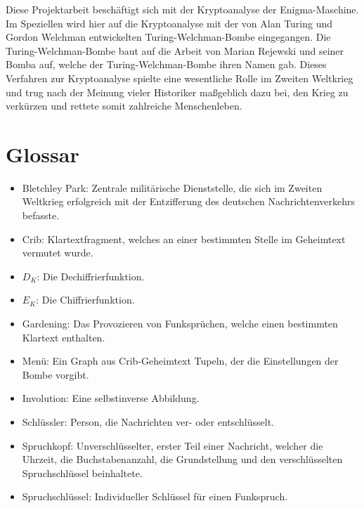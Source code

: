 \documentclass[ngerman, a4paper, justified, nobib, notoc, sfsidenotes]{tufte-book}
\numberwithin{figure}{part}
\numberwithin{table}{part}
\numberwithin{equation}{part}
\numberwithin{mylisting}{part}
\begin{document}
	Diese Projektarbeit beschäftigt sich mit der Kryptoanalyse der Enigma-Maschine.
	Im Speziellen wird hier auf die Kryptoanalyse mit der von Alan Turing und Gordon Welchman entwickelten \glqq Turing-Welchman-Bombe\grqq{} eingegangen.
	Die Turing-Welchman-Bombe baut auf die Arbeit von Marian Rejewski und seiner \glqq Bomba\grqq{} auf, welche der Turing-Welchman-Bombe ihren Namen gab.
	Dieses Verfahren zur Kryptoanalyse spielte eine wesentliche Rolle im Zweiten Weltkrieg und trug nach der Meinung vieler Historiker maßgeblich dazu bei, den Krieg zu verkürzen und rettete somit zahlreiche Menschenleben.
	
	\mainmatter
	
	
	
	
	
	
	
	
	
	\backmatter
	\chapter{Glossar}\label{sec:glossar}
	\begin{itemize}
		\item Bletchley Park: Zentrale militärische Dienststelle, die sich im Zweiten Weltkrieg erfolgreich mit der Entzifferung des deutschen Nachrichtenverkehrs befasste.
		\item Crib: Klartextfragment, welches an einer bestimmten Stelle im Geheimtext vermutet wurde.
		\item $D_K$: Die Dechiffrierfunktion.
		\item $E_K$: Die Chiffrierfunktion.
		\item Gardening: Das Provozieren von Funksprüchen, welche einen bestimmten Klartext enthalten.
		\item Menü: Ein Graph aus Crib-Geheimtext Tupeln, der die Einstellungen der Bombe vorgibt.
		\item Involution: Eine selbstinverse Abbildung.
		\item Schlüssler: Person, die Nachrichten ver- oder entschlüsselt.
		\item Spruchkopf: Unverschlüsselter, erster Teil einer Nachricht, welcher die Uhrzeit, die Buchstabenanzahl, die Grundstellung und den verschlüsselten Spruchschlüssel beinhaltete.
		\item Spruchschlüssel:  Individueller Schlüssel für einen Funkspruch.
	\end{itemize}
	
\end{document}
